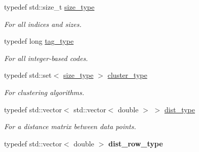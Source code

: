 \begin{DoxyCompactItemize}
\mbox{\label{namespaceretrocombinator_a8e1541b50cee66a791df4c437ccbb385}} 
typedef std\+::size\+\_\+t \hyperlink{namespaceretrocombinator_a8e1541b50cee66a791df4c437ccbb385}{size\+\_\+type}
\begin{DoxyCompactList}\small\item\em For all indices and sizes. \end{DoxyCompactList}\item 
\mbox{\label{namespaceretrocombinator_afd7c6eb4293e8c4d12827609a9a34b9b}} 
typedef long \hyperlink{namespaceretrocombinator_afd7c6eb4293e8c4d12827609a9a34b9b}{tag\+\_\+type}
\begin{DoxyCompactList}\small\item\em For all integer-\/based codes. \end{DoxyCompactList}\end{DoxyCompactItemize}
\textbf{ }\par
\begin{DoxyCompactItemize}
\item 
typedef std\+::set$<$ \hyperlink{namespaceretrocombinator_a8e1541b50cee66a791df4c437ccbb385}{size\+\_\+type} $>$ \hyperlink{namespaceretrocombinator_a316667a6633d664fe892bd7e0eb0141e}{cluster\+\_\+type}
\begin{DoxyCompactList}\small\item\em For clustering algorithms. \end{DoxyCompactList}\item 
\mbox{\label{namespaceretrocombinator_aa416b6a3a9e444eae3309a16b8607750}} 
typedef std\+::vector$<$ std\+::vector$<$ double $>$ $>$ \hyperlink{namespaceretrocombinator_aa416b6a3a9e444eae3309a16b8607750}{dist\+\_\+type}
\begin{DoxyCompactList}\small\item\em For a distance matrix between data points. \end{DoxyCompactList}\item 
\mbox{\label{namespaceretrocombinator_a2386ae0e40bc342fbf7ec8b1c16246c1}} 
typedef std\+::vector$<$ double $>$ {\bfseries dist\+\_\+row\+\_\+type}
\end{DoxyCompactItemize}

